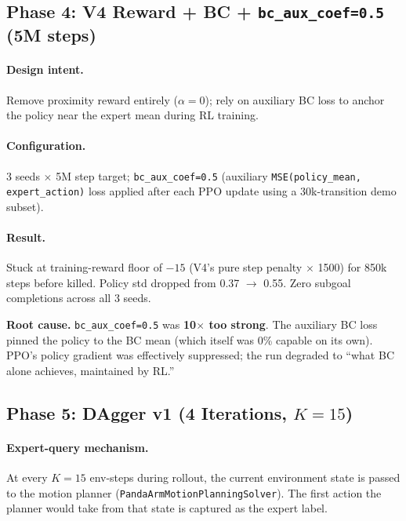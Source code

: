 \documentclass[11pt,letterpaper]{article}
\begin{document}
\subsection{Phase 4: V4 Reward + BC + \texttt{bc\_aux\_coef=0.5} (5M steps)}

\paragraph{Design intent.}
Remove proximity reward entirely ($\alpha = 0$); rely on auxiliary BC loss to
anchor the policy near the expert mean during RL training.

\paragraph{Configuration.}
3 seeds $\times$ 5M step target; \texttt{bc\_aux\_coef=0.5} (auxiliary
\texttt{MSE(policy\_mean, expert\_action)} loss applied after each PPO update
using a 30k-transition demo subset).

\paragraph{Result.}
Stuck at training-reward floor of $-15$ (V4's pure step penalty $\times$ 1500)
for 850k steps before killed. Policy std dropped from 0.37 $\to$ 0.55.
Zero subgoal completions across all 3 seeds.

\begin{finding}
\textbf{Root cause.} \texttt{bc\_aux\_coef=0.5} was \textbf{10$\times$ too strong}.
The auxiliary BC loss pinned the policy to the BC mean (which itself was 0\%
capable on its own). PPO's policy gradient was effectively suppressed; the run
degraded to ``what BC alone achieves, maintained by RL.''
\end{finding}

\subsection{Phase 5: DAgger v1 (4 Iterations, $K=15$)}

\paragraph{Expert-query mechanism.}
At every $K=15$ env-steps during rollout, the current environment state is
passed to the motion planner (\texttt{PandaArmMotionPlanningSolver}). The first
action the planner would take from that state is captured as the expert label.
\end{document}
